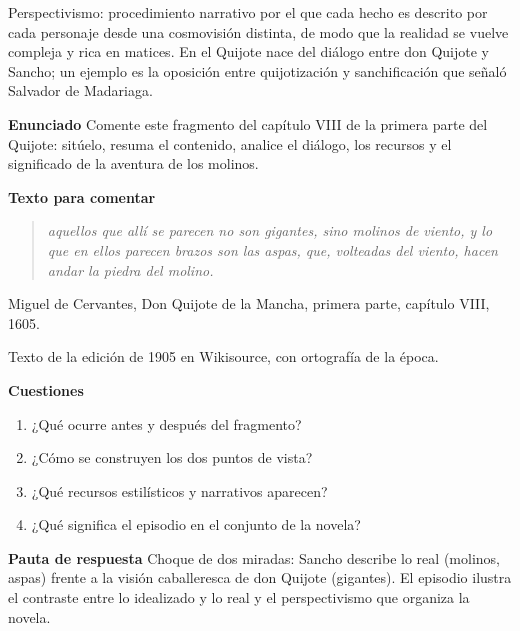 \documentclass{book}
\begin{document}
\begin{tcolorbox}[title={Definición}, studiumdef, breakable]

Perspectivismo: procedimiento narrativo por el que cada hecho es descrito por cada personaje desde una cosmovisión distinta, de modo que la realidad se vuelve compleja y rica en matices. En el Quijote nace del diálogo entre don Quijote y Sancho; un ejemplo es la oposición entre quijotización y sanchificación que señaló Salvador de Madariaga.

\end{tcolorbox}

\begin{tcolorbox}[title={Ejercicio resuelto}, studiumworked, breakable]

\noindent\textbf{Enunciado}
Comente este fragmento del capítulo VIII de la primera parte del Quijote: sitúelo, resuma el contenido, analice el diálogo, los recursos y el significado de la aventura de los molinos.


\noindent\textbf{Texto para comentar}

\begin{quote}
\itshape aquellos que allí se parecen no son gigantes, sino molinos de viento, y lo que en ellos parecen brazos son las aspas, que, volteadas del viento, hacen andar la piedra del molino.
\end{quote}
{\noindent\footnotesize Miguel de Cervantes, Don Quijote de la Mancha, primera parte, capítulo VIII, 1605.\par}
{\noindent\footnotesize Texto de la edición de 1905 en Wikisource, con ortografía de la época.\par}

\noindent\textbf{Cuestiones}
\begin{enumerate}
\item ¿Qué ocurre antes y después del fragmento?
\item ¿Cómo se construyen los dos puntos de vista?
\item ¿Qué recursos estilísticos y narrativos aparecen?
\item ¿Qué significa el episodio en el conjunto de la novela?
\end{enumerate}

\noindent\textbf{Pauta de respuesta}
Choque de dos miradas: Sancho describe lo real (molinos, aspas) frente a la visión caballeresca de don Quijote (gigantes). El episodio ilustra el contraste entre lo idealizado y lo real y el perspectivismo que organiza la novela.



\end{tcolorbox}
\end{document}
